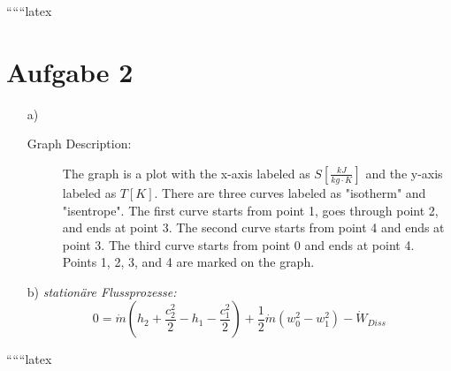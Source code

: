 
``````latex


\section*{Aufgabe 2}

\begin{itemize}
    \item[a)] 
    \begin{description}
        \item[Graph Description:] 
        The graph is a plot with the x-axis labeled as $S \left[ \frac{kJ}{kg \cdot K} \right]$ and the y-axis labeled as $T \left[ K \right]$. There are three curves labeled as "isotherm" and "isentrope". The first curve starts from point 1, goes through point 2, and ends at point 3. The second curve starts from point 4 and ends at point 3. The third curve starts from point 0 and ends at point 4. Points 1, 2, 3, and 4 are marked on the graph.
    \end{description}
    
    \item[b)] 
    \textit{stationäre Flussprozesse:}
    \begin{equation*}
        0 = \dot{m} \left( h_2 + \frac{c^2_2}{2} - h_1 - \frac{c^2_1}{2} \right) + \frac{1}{2} \dot{m} \left( w^2_0 - w^2_1 \right) - \dot{W}_{Diss}
    \end{equation*}
\end{itemize}

``````latex


